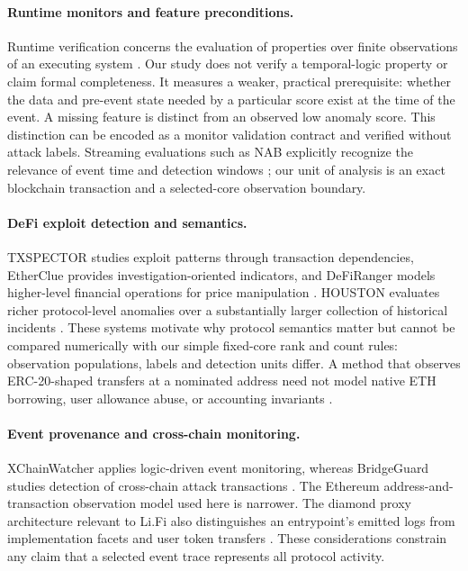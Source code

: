 \documentclass[preprint,12pt,authoryear]{elsarticle}
\begin{document}
\paragraph{Runtime monitors and feature preconditions.} Runtime verification concerns the evaluation of properties over finite observations of an executing system \citep{Leucker2009RV,Bauer2011RV}. Our study does not verify a temporal-logic property or claim formal completeness. It measures a weaker, practical prerequisite: whether the data and pre-event state needed by a particular score exist at the time of the event. A missing feature is distinct from an observed low anomaly score. This distinction can be encoded as a monitor validation contract and verified without attack labels. Streaming evaluations such as NAB explicitly recognize the relevance of event time and detection windows \citep{Lavin2015NAB}; our unit of analysis is an exact blockchain transaction and a selected-core observation boundary.

\paragraph{DeFi exploit detection and semantics.} TXSPECTOR studies exploit patterns through transaction dependencies, EtherClue provides investigation-oriented indicators, and DeFiRanger models higher-level financial operations for price manipulation \citep{Zhang2020TxSpector,Aquilina2021EtherClue,Wu2024DeFiRanger}. HOUSTON evaluates richer protocol-level anomalies over a substantially larger collection of historical incidents \citep{Meng2026Houston}. These systems motivate why protocol semantics matter but cannot be compared numerically with our simple fixed-core rank and count rules: observation populations, labels and detection units differ. A method that observes ERC-20-shaped transfers at a nominated address need not model native ETH borrowing, user allowance abuse, or accounting invariants \citep{Vogelsteller2015ERC20,Revest2022Postmortem,Rari2022Postmortem}.

\paragraph{Event provenance and cross-chain monitoring.} XChainWatcher applies logic-driven event monitoring, whereas BridgeGuard studies detection of cross-chain attack transactions \citep{Augusto2025XChainWatcher,Wu2025BridgeGuard}. The Ethereum address-and-transaction observation model used here is narrower. The diamond proxy architecture relevant to Li.Fi also distinguishes an entrypoint's emitted logs from implementation facets and user token transfers \citep{Mudge2020ERC2535,BlockSec2022LiFi}. These considerations constrain any claim that a selected event trace represents all protocol activity.
\end{document}
